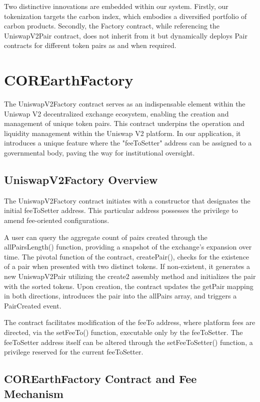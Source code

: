 \documentclass[sigconf, authordraft]{acmart}
\begin{document}
	Two distinctive innovations are embedded within our system. Firstly, our
	tokenization targets the carbon index, which embodies a diversified portfolio of
	carbon products. Secondly, the Factory contract, while referencing the
	UniswapV2Pair contract, does not inherit from it but dynamically deploys Pair contracts
	for different token pairs as and when required.
	\section{COREarthFactory}


	The UniswapV2Factory contract serves as an indispensable element within the
	Uniswap V2 decentralized exchange ecosystem, enabling the creation and management
	of unique token pairs. This contract underpins the operation and liquidity
	management within the Uniswap V2 platform. In our application, it introduces a
	unique feature where the "feeToSetter" address can be assigned to a
	governmental body, paving the way for institutional oversight.

	\subsection{UniswapV2Factory Overview}


	The UniswapV2Factory contract initiates with a constructor that designates the
	initial feeToSetter address. This particular address possesses the privilege
	to amend fee-oriented configurations.

	A user can query the aggregate count of pairs created through the
	allPairsLength() function, providing a snapshot of the exchange's expansion over
	time. The pivotal function of the contract, createPair(), checks for the
	existence of a pair when presented with two distinct tokens. If non-existent,
	it generates a new UniswapV2Pair utilizing the create2 assembly method and
	initializes the pair with the sorted tokens. Upon creation, the contract
	updates the getPair mapping in both directions, introduces the pair into the allPairs
	array, and triggers a PairCreated event.

	The contract facilitates modification of the feeTo address, where platform fees
	are directed, via the setFeeTo() function, executable only by the feeToSetter.
	The feeToSetter address itself can be altered through the setFeeToSetter()
	function, a privilege reserved for the current feeToSetter.

	\subsection{COREarthFactory Contract and Fee Mechanism}
\end{document}
